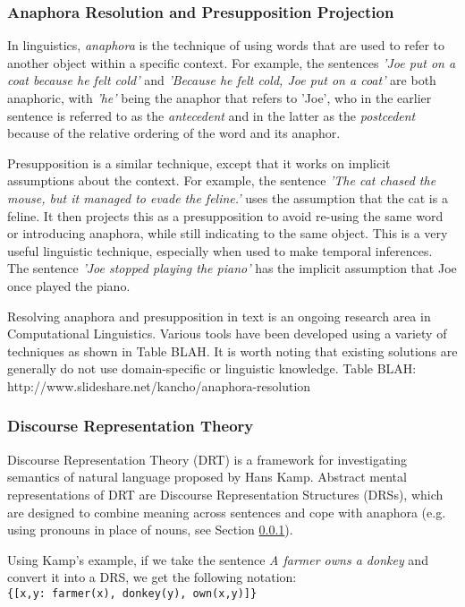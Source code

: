 \subsubsection{Anaphora Resolution and Presupposition Projection}
\label{sec:arback}
In linguistics, \textit{anaphora} is the technique of using words that are used to refer to another object within a specific context. For example, the sentences \textit{'Joe put on a coat because he felt cold'} and \textit{'Because he felt cold, Joe put on a coat'} are both anaphoric, with \textit{'he'} being the anaphor that refers to 'Joe', who in the earlier sentence is referred to as the \textit{antecedent} and in the latter as the \textit{postcedent} because of the relative ordering of the word and its anaphor.

Presupposition is a similar technique, except that it works on implicit assumptions about the context. For example, the sentence \textit{'The cat chased the mouse, but it managed to evade the feline.'} uses the assumption that the cat is a feline. It then projects this as a presupposition to avoid re-using the same word or introducing anaphora, while still indicating to the same object. This is a very useful linguistic technique, especially when used to make temporal inferences. The sentence \textit{'Joe stopped playing the piano'} has the implicit assumption that Joe once played the piano.

Resolving anaphora and presupposition in text is an ongoing research area in Computational Linguistics. Various tools have been developed using a variety of techniques as shown in Table BLAH. It is worth noting that existing solutions are generally do not use domain-specific or linguistic knowledge.
Table BLAH: http://www.slideshare.net/kancho/anaphora-resolution

\subsubsection{Discourse Representation Theory}
\label{sec:drt}
Discourse Representation Theory (DRT)\cite{kamp1993discourse} is a framework for investigating semantics of natural language proposed by Hans Kamp. Abstract mental representations of DRT are Discourse Representation Structures (DRSs), which are designed to combine meaning across sentences and cope with anaphora (e.g. using pronouns in place of nouns, see Section \ref{sec:arback}). 

Using Kamp's example, if we take the sentence \textit{A farmer owns a donkey} and convert it into a DRS, we get the following notation:\\
\texttt{\{[x,y: farmer(x), donkey(y), own(x,y)]\}}

